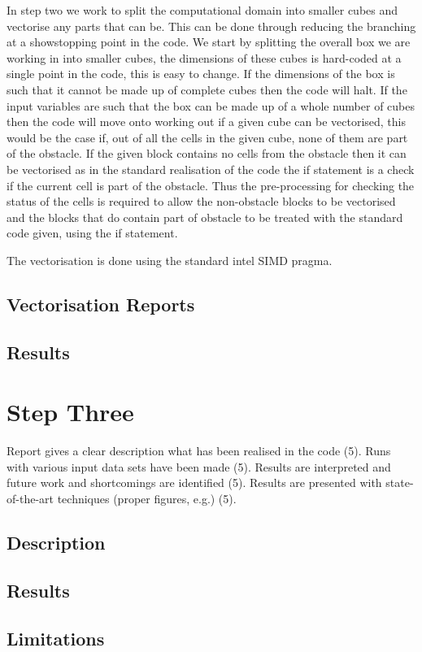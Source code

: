 \documentclass[paper=a4, fontsize=11pt]{scrartcl}
\numberwithin{equation}{section}		%
\numberwithin{figure}{section}			%
\numberwithin{table}{section}				%
\begin{document}
In step two we work to split the computational domain into smaller cubes and vectorise any parts that can be. This can be done through reducing the branching at a showstopping point in the code. We start by splitting the overall box we are working in into smaller cubes, the dimensions of these cubes is hard-coded at a single point in the code, this is easy to change. If the dimensions of the box is such that it cannot be made up of complete cubes then the code will halt. If the input variables are such that the box can be made up of a whole number of cubes then the code will move onto working out if a given cube can be vectorised, this would be the case if, out of all the cells in the given cube, none of them are part of the obstacle. If the given block contains no cells from the obstacle then it can be vectorised as in the standard realisation of the code the if statement is a check if the current cell is part of the obstacle. Thus the pre-processing for checking the status of the cells is required to allow the non-obstacle blocks to be vectorised and the blocks that do contain part of obstacle to be treated with the standard code given, using the if statement.

The vectorisation is done using the standard intel SIMD pragma.

\subsection{Vectorisation Reports}

\subsection{Results}

\section{Step Three}
Report gives a clear description what has been realised in the code (5). Runs with various input data sets have been made (5). Results are interpreted and future work and shortcomings are identified (5). Results are presented with state-of-the-art techniques (proper figures, e.g.) (5).
\subsection{Description}

\subsection{Results}

\subsection{Limitations}

\end{document}

